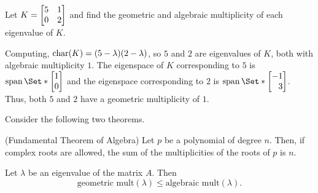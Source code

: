 \begin{example}
	Let $K=\mat{5&1\\0&2}$ and find the geometric and algebraic multiplicity of each eigenvalue of $K$.
	
	Computing, $\operatorname{char}(K)=(5-\lambda)(2-\lambda)$, so $5$ and $2$ are eigenvalues of $K$, both with algebraic multiplicity $1$.
	The eigenspace of $K$ corresponding to $5$ is $\Span\Set*{\mat{1\\0}}$ and the eigenspace
	corresponding to $2$ is $\Span\Set*{\mat{-1\\3}}$. Thus, both $5$ and $2$ have a geometric
	multiplicity of $1$.
\end{example}


Consider the following two theorems.

\begin{theorem}(Fundamental Theorem of Algebra)
	Let $p$ be a polynomial of degree $n$. Then, if complex roots are allowed,
	the sum of the multiplicities of the roots of $p$ is $n$.
\end{theorem}

\begin{theorem}
	Let $\lambda$ be an eigenvalue of the matrix $A$. Then
	\[
		\text{geometric mult}(\lambda)\leq \text{algebraic mult}(\lambda).
	\]
\end{theorem}

